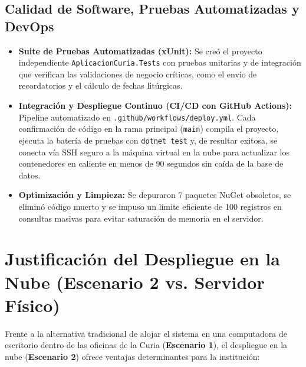 \documentclass[11pt,a4paper]{article}
\begin{document}
\subsection{Calidad de Software, Pruebas Automatizadas y DevOps}
\begin{itemize}[leftmargin=1.2cm]
    \item \textbf{Suite de Pruebas Automatizadas (xUnit):} Se creó el proyecto independiente \texttt{AplicacionCuria.Tests} con pruebas unitarias y de integración que verifican las validaciones de negocio críticas, como el envío de recordatorios y el cálculo de fechas litúrgicas.
    \item \textbf{Integración y Despliegue Continuo (CI/CD con GitHub Actions):} Pipeline automatizado en \texttt{.github/workflows/deploy.yml}. Cada confirmación de código en la rama principal (\texttt{main}) compila el proyecto, ejecuta la batería de pruebas con \texttt{dotnet test} y, de resultar exitosa, se conecta vía SSH seguro a la máquina virtual en la nube para actualizar los contenedores en caliente en menos de 90 segundos sin caída de la base de datos.
    \item \textbf{Optimización y Limpieza:} Se depuraron 7 paquetes NuGet obsoletos, se eliminó código muerto y se impuso un límite eficiente de 100 registros en consultas masivas para evitar saturación de memoria en el servidor.
\end{itemize}

\section{Justificación del Despliegue en la Nube (Escenario 2 vs. Servidor Físico)}

Frente a la alternativa tradicional de alojar el sistema en una computadora de escritorio dentro de las oficinas de la Curia (\textbf{Escenario 1}), el despliegue en la nube (\textbf{Escenario 2}) ofrece ventajas determinantes para la institución:
\end{document}
